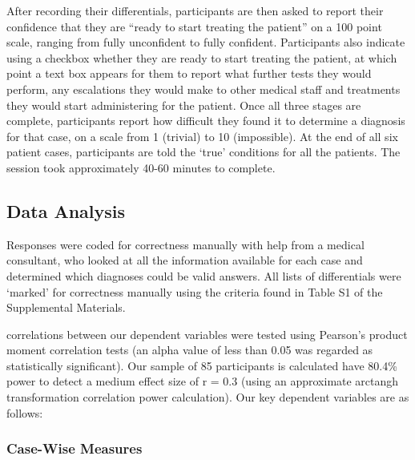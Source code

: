 \documentclass[a4paper, nobind]{templates/ociamthesis}
\begin{document}
After recording their differentials, participants are then asked to report their confidence that they are ``ready to start treating the patient'' on a 100 point scale, ranging from fully unconfident to fully confident. Participants also indicate using a checkbox whether they are ready to start treating the patient, at which point a text box appears for them to report what further tests they would perform, any escalations they would make to other medical staff and treatments they would start administering for the patient. Once all three stages are complete, participants report how difficult they found it to determine a diagnosis for that case, on a scale from 1 (trivial) to 10 (impossible). At the end of all six patient cases, participants are told the `true' conditions for all the patients. The session took approximately 40-60 minutes to complete.

\subsection*{Data Analysis}\label{data-analysis}

Responses were coded for correctness manually with help from a medical consultant, who looked at all the information available for each case and determined which diagnoses could be valid answers. All lists of differentials were `marked' for correctness manually using the criteria found in Table S1 of the Supplemental Materials.

correlations between our dependent variables were tested using Pearson's product moment correlation tests (an alpha value of less than 0.05 was regarded as statistically significant). Our sample of 85 participants is calculated have 80.4\% power to detect a medium effect size of r = 0.3 (using an approximate arctangh transformation correlation power calculation). Our key dependent variables are as follows:

\subsubsection{Case-Wise Measures}\label{case-wise-measures}
\end{document}
